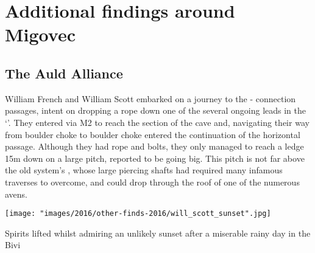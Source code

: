 \section{Additional findings around Migovec}

\subsection{The Auld Alliance}
William French and William Scott embarked on a journey to the - connection passages, intent on dropping a rope down one of the several ongoing leads in the `'. They entered via M2 to reach the  section of the cave and, navigating their way from boulder choke to boulder choke entered the continuation of the horizontal passage. Although they had rope and bolts, they only managed to reach a ledge 15m down on a large pitch, reported to be going big. This pitch is not far above the old system's , whose large piercing shafts had required many infamous traverses to overcome, and could drop through the roof of one of the numerous avens.

\begin{marginfigure}
\checkoddpage \ifoddpage \forcerectofloat \else \forceversofloat \fi
\centering
 \texttt{[image: "images/2016/other-finds-2016/will\_scott\_sunset".jpg]} 
 \caption{Spirits lifted whilst admiring an unlikely sunset after a miserable rainy day in the Bivi }
 \label{Sunset}
\end{marginfigure}



